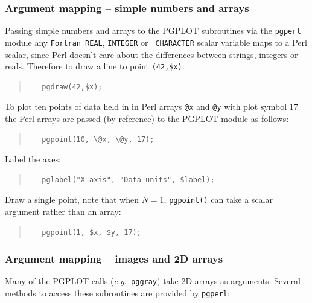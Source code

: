 \documentclass[twoside,11pt]{article}
\begin{document}
\subsubsection{Argument mapping -- simple numbers and arrays}

Passing simple numbers and arrays to the PGPLOT subroutines via the
{\tt pgperl} module any {\tt Fortran REAL}, {\tt INTEGER} or {\tt
CHARACTER} scalar variable maps to a Perl scalar, since Perl doesn't
care about the differences between strings, integers or reals.
Therefore to draw a line to point \verb+(42,$x)+:

\small
\begin{quote}
\begin{verbatim}
   pgdraw(42,$x); 
\end{verbatim}
\end{quote}
\normalsize

To plot ten points of data held in in Perl arrays {\tt @x} and {\tt @y}
with plot symbol 17 the Perl arrays are passed (by reference) to the
PGPLOT module as follows:

\small
\begin{quote}
\begin{verbatim}
   pgpoint(10, \@x, \@y, 17);
\end{verbatim}
\end{quote}
\normalsize

 
Label the axes: 

\small
\begin{quote}
\begin{verbatim}
   pglabel("X axis", "Data units", $label);
\end{verbatim}
\end{quote}
\normalsize

Draw a single point, note that when $N=1$, {\tt pgpoint()} can take a
scalar argument rather than an array:

\small
\begin{quote}
\begin{verbatim}
   pgpoint(1, $x, $y, 17);
\end{verbatim}
\end{quote}
\normalsize

\subsubsection{Argument mapping -- images and 2D arrays}

Many of the PGPLOT calls ({\em e.g.\ }{\tt pggray}) take 2D arrays as
arguments. Several methods to access these subroutines are provided by
{\tt pgperl}:
\end{document}
